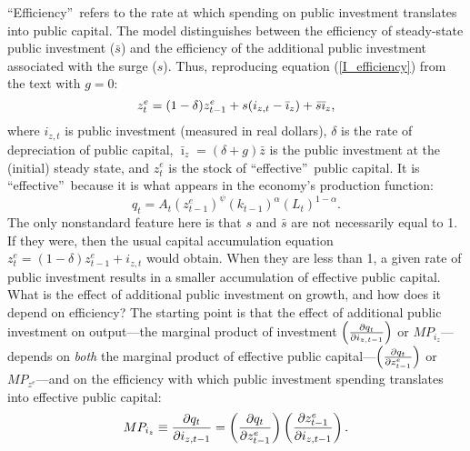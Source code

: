\documentclass[11pt]{article}
\begin{document}
\begin{appendix}
\textquotedblleft Efficiency\textquotedblright\ refers to the rate at which
spending on public investment translates into public capital. The model
distinguishes between the efficiency of steady-state public investment ($%
\bar{s}$) and the efficiency of the additional public investment associated
with the surge ($s$). Thus, reproducing equation (\ref{I_efficiency}) from
the text with $g=0$:%
\begin{equation}
z_{t}^{e}=(1-\delta )z_{t-1}^{e}+s(i_{z,t}-\bar{\imath}_{z})+\bar{s}\bar{%
\imath}_{z},  \label{i-eff}
\end{equation}%
where $i_{z,t}$ is public investment (measured in real dollars), $\delta $
is the rate of depreciation of public capital, $\bar{\imath}_{z}=(\delta +g)%
\bar{z}$ is the public investment at the (initial) steady state, and $%
z_{t}^{e}$ is the stock of \textquotedblleft effective\textquotedblright\
public capital. It is \textquotedblleft effective\textquotedblright\ because
it is what appears in the economy's production function: 
\begin{equation}
q_{t}=A_{t}\left( z_{t-1}^{e}\right) ^{\psi }\left( k_{t-1}\right) ^{\alpha
}\left( L_{t}\right) ^{1-\alpha }.  \label{prod}
\end{equation}%
The only nonstandard feature here is that $s$ and $\bar{s}$ are not
necessarily equal to 1. If they were, then the usual capital accumulation
equation $z_{t}^{e}=(1-\delta )z_{t-1}^{e}+i_{z,t}$ would obtain. When they
are less than 1, a given rate of public investment results in a smaller
accumulation of effective public capital. What is the effect of additional
public investment on growth, and how does it depend on efficiency? The
starting point is that the effect of additional public investment on
output---the marginal product of investment $\left( \frac{\partial q_{t}}{%
\partial i_{z,t-1}}\right) $ or $MP_{i_{z}}$---depends on \textit{both} the
marginal product of effective public capital---$\left( \frac{\partial q_{t}}{%
\partial z_{t-1}^{e}}\right) $ or $MP_{z^{e}}$---and on the efficiency with
which public investment spending translates into effective public capital: 
\begin{equation}
MP_{i_{z}}\equiv \frac{\partial q_{t}}{\partial i_{z,t-1}}=\left( \frac{%
\partial q_{t}}{\partial z_{t-1}^{e}}\right) \left( \frac{\partial
z_{t-1}^{e}}{\partial i_{z,t-1}}\right) .  \label{MPI}
\end{equation}


\end{appendix}
\end{document}

